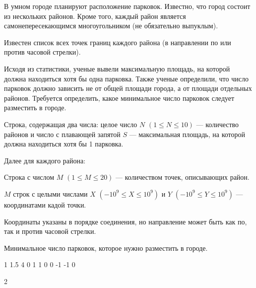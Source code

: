 
В умном городе планируют расположение парковок. Известно, что город состоит из нескольких районов. Кроме того, каждый район является самонепересекающимся многоугольником (не обязательно выпуклым).

Известен список всех точек границ каждого района (в направлении по или против часовой стрелки).

Исходя из статистики, ученые вывели максимальную площадь, на которой должна находиться хотя бы одна парковка. Также ученые определили, что число парковок должно зависить не от общей площади города, а от площади отдельных районов. Требуется определить, какое минимальное число парковок следует разместить в городе.


Строка, содержащая два числа: целое число $N$ $(1 \leq N \leq 10)$ — количество районов и число с плавающей запятой $S$ — максимальная площадь, на которой должна находиться хотя бы 1 парковка.

Далее для каждого района:

Строка с числом $M$ $(1 \leq M \leq 20)$ — количеством точек, описывающих район.

$M$ строк с целыми числами $X$ $(-10^9 \leq X \leq 10^9)$ и $Y$ $(-10^9 \leq Y \leq 10^9)$ — координатами кадой точки.

Координаты указаны в порядке соединения, но направление может быть как по, так и против часовой стрелки.

\outputfmtSection

Минимальное число парковок, которое нужно разместить в городе.


\begin{myverbbox}[\small]{\vinput}
    1 1.5
    4
    0 1
    1 0
    0 -1
    -1 0
\end{myverbbox}
\begin{myverbbox}[\small]{\voutput}
    2
\end{myverbbox}

